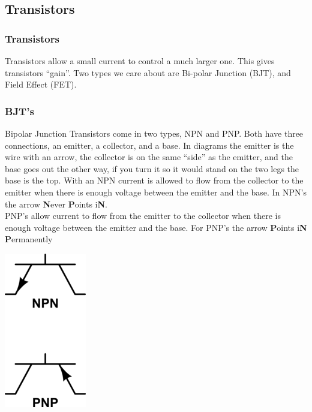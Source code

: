 \documentclass[10pt, handout]{beamer}
\begin{document}
\subsection{Transistors}

\begin{frame}
\frametitle{Transistors}
Transistors allow a small current to control a much larger one. This gives transistors ``gain''. Two types we care about are Bi-polar Junction (BJT), and Field Effect (FET).
\end{frame}

\begin{frame}
\frametitle{BJT's}
Bipolar Junction Transistors come in two types, NPN and PNP. Both have three connections, an emitter, a collector, and a base. In diagrams the emitter is the wire with an arrow, the collector is on the same ``side'' as the emitter, and the base goes out the other way, if you turn it so it would stand on the two legs the base is the top. With an NPN current is allowed to flow from the collector to the emitter when there is enough voltage between the emitter and the base. In NPN's the arrow \textbf{N}ever \textbf{P}oints i\textbf{N}.\\PNP's allow current to flow from the emitter to the collector when there is enough voltage between the emitter and the base. For PNP's the arrow \textbf{P}oints i\textbf{N} \textbf{P}ermanently\\
\begin{center}
\includegraphics{bjts.png}
\end{center}
\end{frame}
\end{document}
